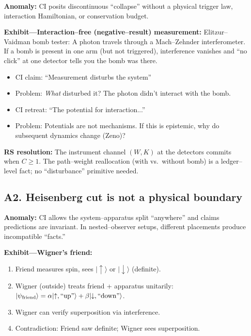 \documentclass[11pt]{article}
\begin{document}
\begin{alertbox}
\textbf{Anomaly:} CI posits discontinuous ``collapse'' without a physical trigger law, interaction Hamiltonian, or conservation budget.
\end{alertbox}

\textbf{Exhibit---Interaction--free (negative--result) measurement:}
Elitzur--Vaidman bomb tester: A photon travels through a Mach--Zehnder interferometer. If a bomb is present in one arm (but not triggered), interference vanishes and ``no click'' at one detector tells you the bomb was there.

\begin{itemize}[nosep]
  \item CI claim: ``Measurement disturbs the system''
  \item Problem: \emph{What} disturbed it? The photon didn't interact with the bomb.
  \item CI retreat: ``The potential for interaction...''
  \item Problem: Potentials are not mechanisms. If this is epistemic, why do subsequent dynamics change (Zeno)?
\end{itemize}

\textbf{RS resolution:} The instrument channel $(W,K)$ at the detectors commits when $C\ge 1$. The path--weight reallocation (with vs.\ without bomb) is a ledger--level fact; no ``disturbance'' primitive needed.

\subsection{A2. Heisenberg cut is not a physical boundary}

\begin{alertbox}
\textbf{Anomaly:} CI allows the system--apparatus split ``anywhere'' and claims predictions are invariant. In nested--observer setups, different placements produce incompatible ``facts.''
\end{alertbox}

\textbf{Exhibit---Wigner's friend:}
\begin{enumerate}[nosep]
  \item Friend measures spin, sees $|\uparrow\rangle$ or $|\downarrow\rangle$ (definite).
  \item Wigner (outside) treats friend + apparatus unitarily: $|\psi_{\rm friend}\rangle = \alpha|{\uparrow,\text{``up''}}\rangle + \beta|{\downarrow,\text{``down''}}\rangle$.
  \item Wigner can verify superposition via interference.
  \item Contradiction: Friend saw definite; Wigner sees superposition.
\end{enumerate}
\end{document}
